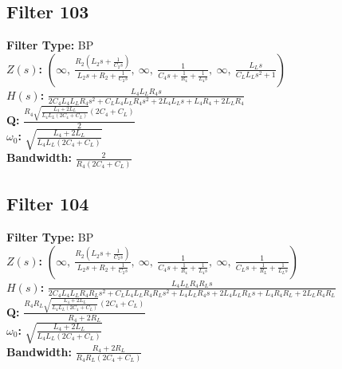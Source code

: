 \documentclass{article}
\begin{document}
\subsection*{Filter 103}
\textbf{Filter Type:} BP \\ 
\textbf{$Z(s)$:} $\left( \infty, \  \frac{R_{2} \left(L_{2} s + \frac{1}{C_{2} s}\right)}{L_{2} s + R_{2} + \frac{1}{C_{2} s}}, \  \infty, \  \frac{1}{C_{4} s + \frac{1}{R_{4}} + \frac{1}{L_{4} s}}, \  \infty, \  \frac{L_{L} s}{C_{L} L_{L} s^{2} + 1}\right)$ \\ 
\textbf{$H(s)$:} $\frac{L_{4} L_{L} R_{4} s}{2 C_{4} L_{4} L_{L} R_{4} s^{2} + C_{L} L_{4} L_{L} R_{4} s^{2} + 2 L_{4} L_{L} s + L_{4} R_{4} + 2 L_{L} R_{4}}$ \\ 
\textbf{Q:} $\frac{R_{4} \sqrt{\frac{L_{4} + 2 L_{L}}{L_{4} L_{L} \left(2 C_{4} + C_{L}\right)}} \left(2 C_{4} + C_{L}\right)}{2}$ \\ 
\textbf{$\omega_0$:} $\sqrt{\frac{L_{4} + 2 L_{L}}{L_{4} L_{L} \left(2 C_{4} + C_{L}\right)}}$ \\ 
\textbf{Bandwidth:} $\frac{2}{R_{4} \left(2 C_{4} + C_{L}\right)}$ \\ 
\subsection*{Filter 104}
\textbf{Filter Type:} BP \\ 
\textbf{$Z(s)$:} $\left( \infty, \  \frac{R_{2} \left(L_{2} s + \frac{1}{C_{2} s}\right)}{L_{2} s + R_{2} + \frac{1}{C_{2} s}}, \  \infty, \  \frac{1}{C_{4} s + \frac{1}{R_{4}} + \frac{1}{L_{4} s}}, \  \infty, \  \frac{1}{C_{L} s + \frac{1}{R_{L}} + \frac{1}{L_{L} s}}\right)$ \\ 
\textbf{$H(s)$:} $\frac{L_{4} L_{L} R_{4} R_{L} s}{2 C_{4} L_{4} L_{L} R_{4} R_{L} s^{2} + C_{L} L_{4} L_{L} R_{4} R_{L} s^{2} + L_{4} L_{L} R_{4} s + 2 L_{4} L_{L} R_{L} s + L_{4} R_{4} R_{L} + 2 L_{L} R_{4} R_{L}}$ \\ 
\textbf{Q:} $\frac{R_{4} R_{L} \sqrt{\frac{L_{4} + 2 L_{L}}{L_{4} L_{L} \left(2 C_{4} + C_{L}\right)}} \left(2 C_{4} + C_{L}\right)}{R_{4} + 2 R_{L}}$ \\ 
\textbf{$\omega_0$:} $\sqrt{\frac{L_{4} + 2 L_{L}}{L_{4} L_{L} \left(2 C_{4} + C_{L}\right)}}$ \\ 
\textbf{Bandwidth:} $\frac{R_{4} + 2 R_{L}}{R_{4} R_{L} \left(2 C_{4} + C_{L}\right)}$ \\ 
\end{document}
